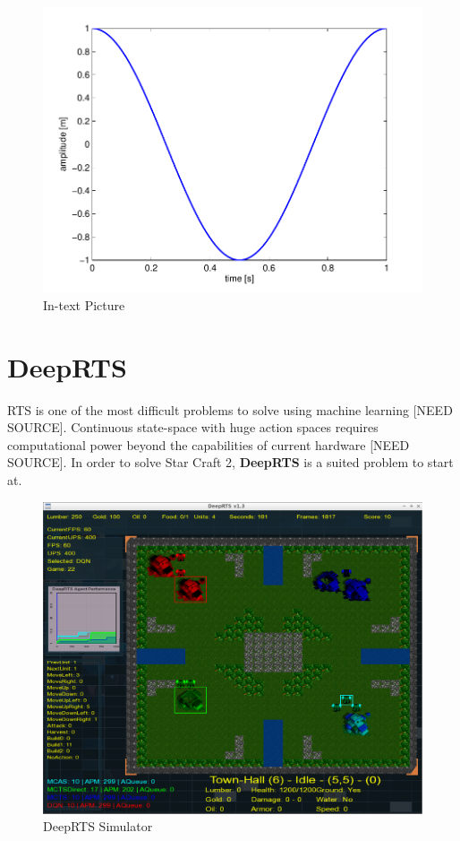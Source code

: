 \documentclass[fleqn,10pt]{article} %
\begin{document}
\begin{figure}[ht]\centering
\includegraphics[width=\linewidth]{results}
\caption{In-text Picture}
\label{fig:results}
\end{figure}

\section{DeepRTS}
RTS is one of the most difficult problems to solve using machine learning [NEED SOURCE]. Continuous state-space with huge action spaces requires computational power beyond the capabilities of current hardware [NEED SOURCE]. In order to solve Star Craft 2, \textbf{DeepRTS} is a suited problem to start at.


\begin{figure}[ht]\centering
\includegraphics[width=\linewidth]{deep_rts}
\caption{DeepRTS Simulator}
\label{fig:results}
\end{figure}
\end{document}
